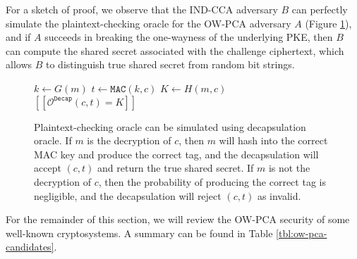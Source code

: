 \documentclass[runningheads]{llncs}
\newcommand{\decap}{\texttt{Decap}}
\newcommand{\mac}{\texttt{MAC}}
\newcommand{\pco}{\texttt{PCO}}
\newcommand{\llbrack}{[\![}
\newcommand{\rrbrack}{]\!]}
\begin{document}
For a sketch of proof, we observe that the IND-CCA adversary $B$ can perfectly simulate the plaintext-checking oracle for the OW-PCA adversary $A$ (Figure \ref{fig:simulate-pca-oracle-with-cca-oracle}), and if $A$ succeeds in breaking the one-wayness of the underlying PKE, then $B$ can compute the shared secret associated with the challenge ciphertext, which allows $B$ to distinguish true shared secret from random bit strings.

\begin{figure}[h]
    \centering
    \begin{minipage}[t]{0.4\textwidth}
        \begin{algorithm}[H]
            \caption*{$\mathcal{O}^\pco_\decap(m, c)$}
            \begin{algorithmic}[1]
                \State $k \leftarrow G(m)$
                \State $t \leftarrow \mac(k, c)$
                \State $K \leftarrow H(m, c)$
                \State \Return $\llbrack \mathcal{O}^\decap(c, t) = K\rrbrack$
            \end{algorithmic}
        \end{algorithm}
    \end{minipage}
    \caption{Plaintext-checking oracle can be simulated using decapsulation oracle. If $m$ is the decryption of $c$, then $m$ will hash into the correct MAC key and produce the correct tag, and the decapsulation will accept $(c, t)$ and return the true shared secret. If $m$ is not the decryption of $c$, then the probability of producing the correct tag is negligible, and the decapsulation will reject $(c, t)$ as invalid.}\label{fig:simulate-pca-oracle-with-cca-oracle}
\end{figure}

For the remainder of this section, we will review the OW-PCA security of some well-known cryptosystems. A summary can be found in Table \ref{tbl:ow-pca-candidates}.
\end{document}
